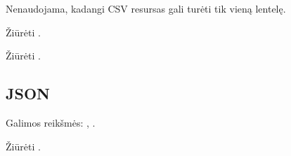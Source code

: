 \documentclass[letterpaper,10pt,lithuanian]{sphinxmanual}
\begin{document}
\begin{fulllineitems}

\pysigstartsignatures
{}
\pysigstopsignatures
\sphinxAtStartPar
Nenaudojama, kadangi CSV resursas gali turėti tik vieną lentelę.

\end{fulllineitems}



\begin{fulllineitems}

\pysigstartsignatures
{}
\pysigstopsignatures
\sphinxAtStartPar
Žiūrėti {\hyperref[\detokenize{formules:stulpeliai-lenteleje}]{}}.

\end{fulllineitems}



\begin{fulllineitems}

\pysigstartsignatures
{}
\pysigstopsignatures
\sphinxAtStartPar
Žiūrėti {\hyperref[\detokenize{formules:stulpeliai-lenteleje}]{}}.

\end{fulllineitems}



\subsection{JSON}
\label{\detokenize{saltiniai:json}}

\begin{fulllineitems}

\pysigstartsignatures
{}
\pysigstopsignatures
\sphinxAtStartPar
Galimos reikšmės: , .

\end{fulllineitems}



\begin{fulllineitems}

\pysigstartsignatures
{}
\pysigstopsignatures
\sphinxAtStartPar
Žiūrėti {\hyperref[\detokenize{formules:failai}]{}}.

\end{fulllineitems}
\end{document}
